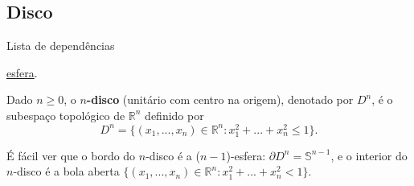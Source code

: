 \subsection{Disco}
\label{disco-def}
\begin{titlemize}{Lista de dependências}
	\item \hyperref[esfera-def]{esfera}.
\end{titlemize}
\begin{defi}
     Dado $n\geq 0$, o \textbf{$n$-disco} (unitário com centro na origem), denotado por $D^n$, é o subespaço topológico de $\mathbb{R}^{n}$ definido por 
     \[D^n=\{(x_1,...,x_n)\in \mathbb{R}^{n}:x_1^2+...+x_n^2\le 1\}.\]
\end{defi}
É fácil ver que o bordo do $n$-disco é a ($n-1$)-esfera: $\partial D^n = \mathbb{S}^{n-1}$, e o interior do $n$-disco é a bola aberta $\{(x_1,...,x_n)\in \mathbb{R}^n:x_1^2+...+x_n^2<1\}$.
